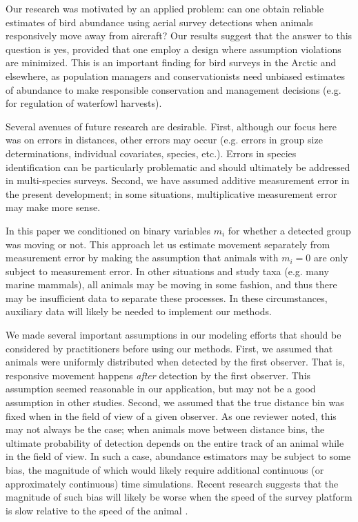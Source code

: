 \documentclass[aoas,preprint]{imsart}
\numberwithin{equation}{section}
\theoremstyle{plain}
\begin{document}
Our research was motivated by an applied problem: can one obtain reliable estimates of bird abundance using aerial survey detections when animals responsively move away from aircraft?  Our results suggest that the answer to this question is yes, provided that one employ a design where assumption violations are minimized.  This is an important finding for bird surveys in the Arctic and elsewhere, as population managers and conservationists need unbiased estimates of abundance to make responsible conservation and management decisions (e.g. for regulation of waterfowl harvests).

Several avenues of future research are desirable.  First, although our focus here was on errors in distances, other errors may occur (e.g. errors in group size determinations, individual covariates, species, etc.).  Errors in species identification can be particularly problematic \citep[e.g.][]{ConnEtAl2014} and should ultimately be addressed in multi-species surveys.  Second, we have assumed additive measurement error in the present development; in some situations, multiplicative measurement error \citep[whereby animals farther away are subject to greater measurement error;][]{BorchersEtAl2010} may make more sense.

In this paper we conditioned on binary variables $m_i$ for whether a detected group was moving or not. This approach let us estimate movement separately from measurement error by making the assumption that animals with $m_i=0$ are only subject to measurement error.  In other situations and study taxa (e.g. many marine mammals), all animals may be moving in some fashion, and thus there may be insufficient data to separate these processes.  In these circumstances, auxiliary data \citep[e.g. animals with known location to estimate measurement error; cf.][]{BorchersEtAl2010} will likely be needed to implement our methods.

We made several important assumptions in our modeling efforts that should be considered by practitioners before using our methods.  First, we assumed that animals were uniformly distributed when detected by the first observer.  That is, responsive movement happens \textit{after} detection by the first observer.  This assumption seemed reasonable in our application, but may not be a good assumption in other studies.  Second, we assumed that the true distance bin was fixed when in the field of view of a given observer.  As one reviewer noted, this may not always be the case; when animals move between distance bins, the ultimate probability of detection depends on the entire track of an animal while in the field of view. In such a case, abundance estimators may be subject to some bias, the magnitude of which would likely require additional continuous (or approximately continuous) time simulations.  Recent research suggests that the magnitude of such bias will likely be worse when the speed of the survey platform is slow relative to the speed of the animal \citep{GlennieEtAl2015}.
\end{document}
